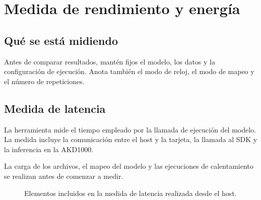 \chapter{Medida de rendimiento y energía}
\label{chap:medida}
\label{chap:rendimiento}

\section{Qué se está midiendo}

Antes de comparar resultados, mantén fijos el modelo, los datos y la configuración de
ejecución. Anota también el modo de reloj, el modo de mapeo y el número de repeticiones.


\section{Medida de latencia}

La herramienta mide el tiempo empleado por la llamada de ejecución del modelo. La medida
incluye la comunicación entre el host y la tarjeta, la llamada al SDK y la inferencia en
la AKD1000.

La carga de los archivos, el mapeo del modelo y las ejecuciones de calentamiento se realizan
antes de comenzar a medir.

\begin{figure}[H]
  \centering

  \caption[Frontera de la medida de latencia]
  {Elementos incluidos en la medida de latencia realizada desde el host.}
  \label{fig:measurement-boundary}
\end{figure}

